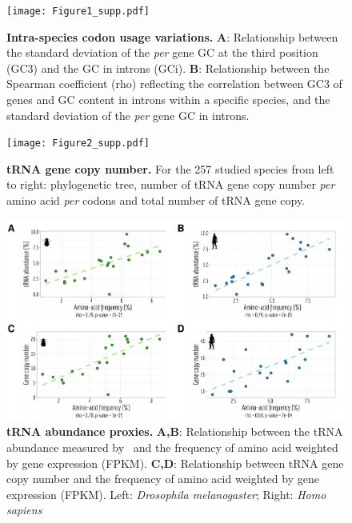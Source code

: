 \newpage


\begin{figure}[t]
    \centering                                                                            
    \texttt{[image: Figure1\_supp.pdf]}                                               
    \caption[Intra-species codon usage variations]{\textbf{Intra-species codon usage variations.} \textbf{A}: Relationship between the standard deviation of the \textit{per} gene GC at the third position (GC3) and the GC in introns (GCi). \textbf{B}: Relationship between the Spearman coefficient (rho) reflecting the correlation between GC3 of genes and GC content in introns within a specific species, and the standard deviation of the \textit{per} gene GC in introns.}
    \label{suppfig:CU1}
\end{figure}


\begin{figure}[t]
    \centering                                                                            
    \texttt{[image: Figure2\_supp.pdf]}                                   
    \caption[tRNA gene copy number]{\textbf{tRNA gene copy number.} For the 257 studied species from left to right: phylogenetic tree, number of tRNA gene copy number \textit{per} amino acid \textit{per} codons and total number of tRNA gene copy.} 
    \label{suppfig:CU2}
\end{figure}


\begin{figure}[t]
    \centering                                                                            
    \includegraphics[width=\textwidth]{Figure3_supp.pdf}                                   
    \caption[tRNA abundance proxies]{\textbf{tRNA abundance proxies.} \textbf{A,B}: Relationship between the tRNA abundance measured by~\citet{behrens_high-resolution_2021} and the frequency of amino acid weighted by gene expression (FPKM). \textbf{C,D}: Relationship between tRNA gene copy number and the frequency of amino acid weighted by gene expression (FPKM). Left: \textit{Drosophila melanogaster}; Right: \textit{Homo sapiens}} 
    \label{suppfig:CU3}
\end{figure}

